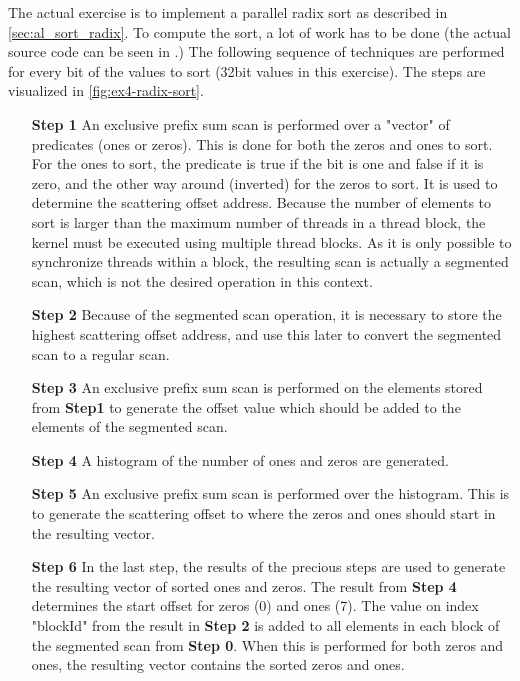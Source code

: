 The actual exercise is to implement a parallel radix sort as described in \autoref{sec:al_sort_radix}.
To compute the sort, a lot of work has to be done (the actual source code can be seen in \cite{exercises}.)
The following sequence of techniques are performed for every bit of the values to sort (32bit values in this exercise).
The steps are visualized in \autoref{fig:ex4-radix-sort}.
\begin{enumerate}
	\item[\textbf{Step 1}]
	An exclusive prefix sum scan is performed over a "vector" of predicates (ones or zeros).
	This is done for both the zeros and ones to sort.
	For the ones to sort, the predicate is true if the bit is one and false if it is zero, and the other way around (inverted) for the zeros to sort.
	It is used to determine the scattering offset address.
	Because the number of elements to sort is larger than the maximum number of threads in a thread block, the kernel must be executed using multiple thread blocks.
	As it is only possible to synchronize threads within a block, the resulting scan is actually a segmented scan, which is not the desired operation in this context.
	\item[\textbf{Step 2}]
	Because of the segmented scan operation, it is necessary to store the highest scattering offset address, and use this later to convert the segmented scan to a regular scan. 
	\item[\textbf{Step 3}]
	An exclusive prefix sum scan is performed on the elements stored from \textbf{Step1} to generate the offset value which should be added to the elements of the segmented scan.
	\item[\textbf{Step 4}]
	A histogram of the number of ones and zeros are generated.
	\item[\textbf{Step 5}]
	An exclusive prefix sum scan is performed over the histogram.
	This is to generate the scattering offset to where the zeros and ones should start in the resulting vector.
	\item[\textbf{Step 6}]
	In the last step, the results of the precious steps are used to generate the resulting vector of sorted ones and zeros.
	The result from \textbf{Step 4} determines the start offset for zeros (0) and ones (7).	
	The value on index "blockId" from the result in \textbf{Step 2} is added to all elements in each block of the segmented scan from \textbf{Step 0}.
	When this is performed for both zeros and ones, the resulting vector contains the sorted zeros and ones.
\end{enumerate}

